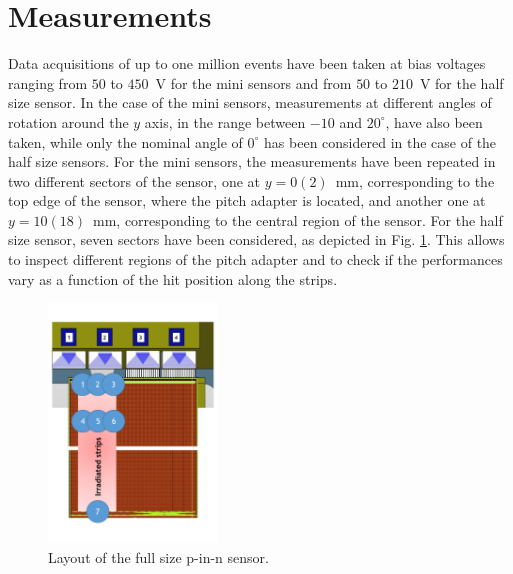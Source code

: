 \section{Measurements}
\label{sec:Measurements}

Data acquisitions of up to one million events have been taken at bias voltages ranging from $50$ to $450$~V for the mini sensors and from $50$ to $210$~V for the half size sensor.
In the case of the mini sensors, measurements at different angles of rotation around the $y$ axis, in the range between $-10$ and $20^\circ$, have also been taken, while only the nominal angle of $0^\circ$  has been considered in the case of the half size sensors.
For the mini sensors, the measurements have been repeated in two different sectors of the sensor, one at $y=0(2)$~mm, corresponding to the top edge of the sensor, where the pitch adapter is located, and another one at $y=10(18)$~mm, corresponding to the central region of the sensor.
For the half size sensor, seven sectors have been considered, as depicted in Fig. \ref{fig:F1}. This allows to inspect different regions of the pitch adapter and to check if the performances vary as a function of the hit position along the strips.

\begin{figure}[]
\centering
\includegraphics[width=0.4\textwidth]{figs/F1.pdf}
\caption[Layout of the half size p-in-n sensor.]{Layout of the full size p-in-n sensor.}
\label{fig:F1}
\end{figure}